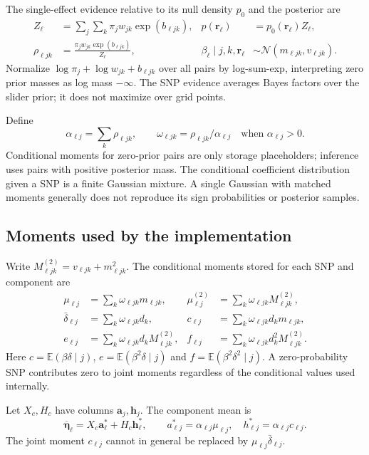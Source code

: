 \documentclass[11pt]{article}
\newcommand{\Normal}{\mathcal N}
\newcommand{\E}{\mathbb E}
\newcommand{\etal}{\overline{\boldsymbol\eta}}
\begin{document}
The single-effect evidence relative to its null density $p_0$ and the
posterior are
\begin{align}
 Z_\ell&=\sum_j\sum_k\pi_jw_{jk}\exp(b_{\ell jk}),&
 p(\mathbf r_\ell)&=p_0(\mathbf r_\ell)Z_\ell,\label{eq:evidence}\\
 \rho_{\ell jk}&=\frac{\pi_jw_{jk}\exp(b_{\ell jk})}{Z_\ell},&
 \beta_\ell\mid j,k,\mathbf r_\ell&\sim\Normal(m_{\ell jk},v_{\ell jk}).
 \label{eq:rho}
\end{align}
Normalize $\log\pi_j+\log w_{jk}+b_{\ell jk}$ over all pairs by
log-sum-exp, interpreting zero prior masses as log mass $-\infty$.
The SNP evidence averages Bayes factors over the slider prior; it does
not maximize over grid points.

Define
\begin{equation}
 \alpha_{\ell j}=\sum_k\rho_{\ell jk},\qquad
 \omega_{\ell jk}=\rho_{\ell jk}/\alpha_{\ell j}
 \quad\text{when }\alpha_{\ell j}>0.
 \label{eq:conditional}
\end{equation}
Conditional moments for zero-prior pairs are only storage placeholders;
inference uses pairs with positive posterior mass.
The conditional coefficient distribution given a SNP is a finite
Gaussian mixture. A single Gaussian with matched moments generally
does not reproduce its sign probabilities or posterior samples.

\subsection{Moments used by the implementation}
Write $M^{(2)}_{\ell jk}=v_{\ell jk}+m_{\ell jk}^2$. The conditional
moments stored for each SNP and component are
\begin{align}
 \mu_{\ell j}&=\sum_k\omega_{\ell jk}m_{\ell jk},&
 \mu^{(2)}_{\ell j}&=\sum_k\omega_{\ell jk}M^{(2)}_{\ell jk},\nonumber\\
 \bar\delta_{\ell j}&=\sum_k\omega_{\ell jk}d_k,&
 c_{\ell j}&=\sum_k\omega_{\ell jk}d_km_{\ell jk},\nonumber\\
 e_{\ell j}&=\sum_k\omega_{\ell jk}d_kM^{(2)}_{\ell jk},&
 f_{\ell j}&=\sum_k\omega_{\ell jk}d_k^2M^{(2)}_{\ell jk}.
 \label{eq:aggregates}
\end{align}
Here $c=\E(\beta\delta\mid j)$, $e=\E(\beta^2\delta\mid j)$ and
$f=\E(\beta^2\delta^2\mid j)$. A zero-probability SNP contributes zero
to joint moments regardless of the conditional values used internally.

Let $X_c,H_c$ have columns $\mathbf a_j,\mathbf h_j$. The component mean is
\begin{equation}
 \etal_\ell=X_c\mathbf a_\ell^*+H_c\mathbf h_\ell^*,\qquad
 a^*_{\ell j}=\alpha_{\ell j}\mu_{\ell j},\quad
 h^*_{\ell j}=\alpha_{\ell j}c_{\ell j}.
 \label{eq:fit}
\end{equation}
The joint moment $c_{\ell j}$ cannot in general be replaced by
$\mu_{\ell j}\bar\delta_{\ell j}$.
\end{document}
